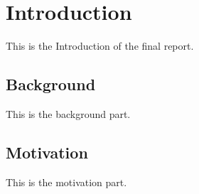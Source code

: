 \section{Introduction} 
This is the Introduction of the final report.
\subsection{Background}
This is the background part.
\subsection{Motivation}
This is the motivation part.

\newpage